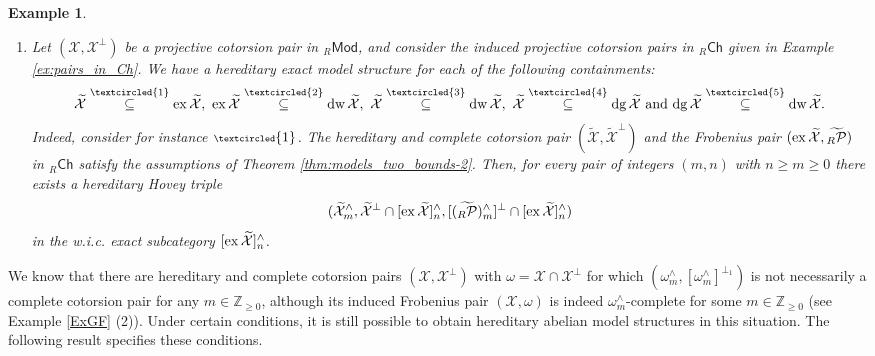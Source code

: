 \documentclass[10pt,reqno]{amsart}
\numberwithin{equation}{section}
\newtheorem{example}[definition]{Example}
\theoremstyle{remark}
\newcommand{\X}{\mathcal{X}}
\begin{document}
\begin{example}
\begin{enumerate}[(1)]
\item Let $(\X,\X^\perp)$ be a projective cotorsion pair in ${}_R\mathsf{Mod}$, and consider the induced projective cotorsion pairs in ${}_R\mathsf{Ch}$ given in Example \ref{ex:pairs_in_Ch}. We have a hereditary exact model structure for each of the following containments:
\[
\widetilde{\X} \stackrel{\scriptsize\textcircled{1}}\subseteq {\rm ex}\,\widetilde{\X}, \, \, {\rm ex}\,\widetilde{\X} \stackrel{\scriptsize\textcircled{2}}\subseteq {\rm dw}\,\widetilde{\X}, \, \, \widetilde{\X} \stackrel{\scriptsize\textcircled{3}}\subseteq {\rm dw}\,\widetilde{\X}, \, \, \widetilde{\X} \stackrel{\scriptsize\textcircled{4}}\subseteq {\rm dg}\,\widetilde{\X} \, \, \text{and} \, \, {\rm dg}\,\widetilde{\X} \stackrel{\scriptsize\textcircled{5}}\subseteq {\rm dw}\,\widetilde{\X}.
\]
Indeed, consider for instance ${\scriptsize\textcircled{1}}$. The hereditary and complete cotorsion pair $(\widetilde{\X},\widetilde{\X}^\perp)$ and the Frobenius pair $({\rm ex}\,\widetilde{\X},\widetilde{{}_R\mathcal{P}})$ in ${}_R\mathsf{Ch}$ satisfy the assumptions of Theorem \ref{thm:models_two_bounds-2}. Then, for every pair of integers $(m,n)$ with $n \geq m \geq 0$ there exists a hereditary Hovey triple
\[
(\widetilde{\X}^\wedge_m,\widetilde{\X}^\perp \cap [{\rm ex}\,\widetilde{\X}]^\wedge_n,[(\widetilde{{}_R\mathcal{P}})^\wedge_m]^\perp \cap [{\rm ex}\,\widetilde{\X}]^\wedge_n)
\]
in the w.i.c. exact subcategory $[{\rm ex}\,\widetilde{\X}]^\wedge_n$.
\end{enumerate} 
\end{example}


We know that there are hereditary and complete cotorsion pairs $(\X,\X^\perp)$ with $\omega = \X \cap \X^\perp$ for which $(\omega^\wedge_m,[\omega^\wedge_m]^{\perp_1})$ is not necessarily a complete cotorsion pair for any $m \in \mathbb{Z}_{\geq 0}$, although its induced Frobenius pair $(\X,\omega)$ is indeed $\omega^\wedge_m$-complete for some $m \in \mathbb{Z}_{\geq 0}$ (see Example \ref{ExGF} (2)). Under certain conditions, it is still possible to obtain hereditary abelian model structures in this situation. The following result specifies these conditions.  
\end{document}
